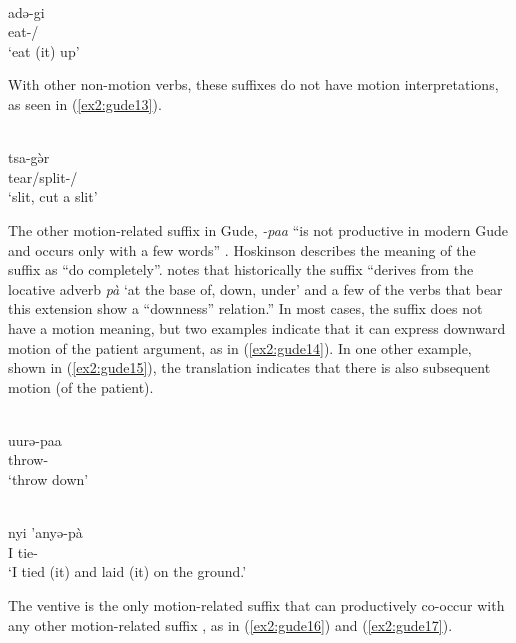 \ex\label{ex2:gude12}
 \\
\gll adə-gi	\\
eat-/ \\
\glt `eat (it) up'
\z 

With other non-motion verbs, these suffixes do not have motion interpretations, as seen in (\ref{ex2:gude13}).

\ea\label{ex2:gude13}
 \\
\gll tsa-gə̀r\\
tear/split-/	\\
\glt `slit, cut a slit'
\z 

The other motion-related suffix in Gude, \textit{-paa} ``is not productive in modern Gude and occurs only with a few words'' \citep[101]{hoskinsonGrammarDictionaryGude1983}. Hoskinson describes the meaning of the suffix as ``do completely''. \citet[359]{schuhChadicCornucopia2017} notes that historically the suffix ``derives from the locative adverb \textit{pà} ‘at the base of, down, under’ and a few of the verbs that bear this extension show a ``downness'' relation.'' In most cases, the suffix does not have a motion meaning, but two examples indicate that it can express downward motion of the patient argument, as in (\ref{ex2:gude14}). In one other example, shown in (\ref{ex2:gude15}), the translation indicates that there is also subsequent motion (of the patient).

\ea\label{ex2:gude14}
 \\
\gll uurə-paa	\\
throw- \\
\glt `throw down'

\ex\label{ex2:gude15}
 \\
\gll  nyi 'anyə-pà \\
I tie-	\\
\glt `I tied (it) and laid (it) on the ground.'
\z 

The ventive is the only motion-related suffix that can productively co-occur with any other motion-related suffix \citep[95]{hoskinsonGrammarDictionaryGude1983}, as in (\ref{ex2:gude16}) and (\ref{ex2:gude17}).

